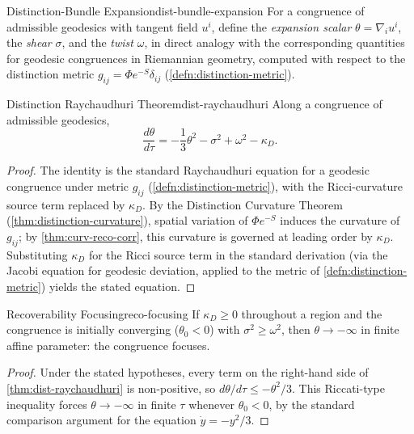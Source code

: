 \documentclass[12pt,twoside,openright]{book}
\begin{document}
\begin{definition}{Distinction-Bundle Expansion}{dist-bundle-expansion}
  For a congruence of admissible geodesics with tangent
  field $u^i$, define the \emph{expansion scalar}
  $\theta = \nabla_i u^i$, the \emph{shear} $\sigma$, and the
  \emph{twist} $\omega$, in direct analogy with the
  corresponding quantities for geodesic congruences in
  Riemannian geometry, computed with respect to the
  distinction metric $g_{ij} = \Phi e^{-S}\delta_{ij}$
  (\cref{defn:distinction-metric}).
\end{definition}

\begin{theorem}{Distinction Raychaudhuri Theorem}{dist-raychaudhuri}
  Along a congruence of admissible geodesics,
  \[
    \frac{d\theta}{d\tau}
    = -\frac{1}{3}\theta^2 - \sigma^2 + \omega^2 - \kappa_D.
  \]
\end{theorem}

\begin{proof}
  The identity is the standard Raychaudhuri equation for a
  geodesic congruence under metric $g_{ij}$
  (\cref{defn:distinction-metric}), with the Ricci-curvature
  source term replaced by $\kappa_D$. By the Distinction
  Curvature Theorem (\cref{thm:distinction-curvature}),
  spatial variation of $\Phi e^{-S}$ induces the curvature of
  $g_{ij}$; by \cref{thm:curv-reco-corr}, this curvature is
  governed at leading order by $\kappa_D$. Substituting
  $\kappa_D$ for the Ricci source term in the standard
  derivation (via the Jacobi equation for geodesic
  deviation, applied to the metric of
  \cref{defn:distinction-metric}) yields the stated
  equation.
\end{proof}

\begin{corollary}{Recoverability Focusing}{reco-focusing}
  If $\kappa_D \ge 0$ throughout a region and the congruence
  is initially converging ($\theta_0 < 0$) with
  $\sigma^2 \ge \omega^2$, then $\theta \to -\infty$ in
  finite affine parameter: the congruence focuses.
\end{corollary}

\begin{proof}
  Under the stated hypotheses, every term on the right-hand
  side of \cref{thm:dist-raychaudhuri} is non-positive, so
  $d\theta/d\tau \le -\theta^2/3$. This Riccati-type
  inequality forces $\theta \to -\infty$ in finite $\tau$
  whenever $\theta_0 < 0$, by the standard comparison
  argument for the equation $\dot y = -y^2/3$.
\end{proof}
\end{document}
